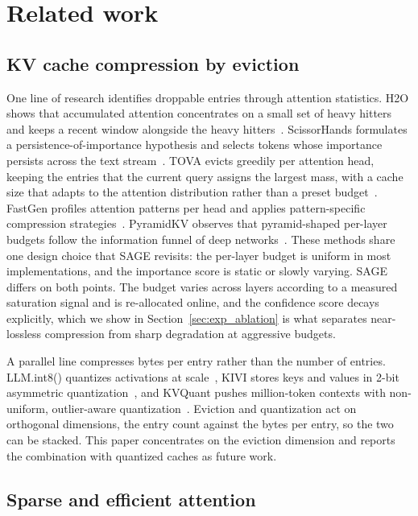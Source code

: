 \section{Related work}\label{sec:related}

\subsection{KV cache compression by eviction}

One line of research identifies droppable entries through attention
statistics. H2O shows that accumulated attention concentrates on a
small set of heavy hitters and keeps a recent window alongside the
heavy hitters~\cite{zhang2023h2o}. ScissorHands formulates a
persistence-of-importance hypothesis and selects tokens whose
importance persists across the text
stream~\cite{liu2023scissorhands}. TOVA evicts greedily per attention
head, keeping the entries that the current query assigns the largest
mass, with a cache size that adapts to the attention distribution
rather than a preset budget~\cite{PLACEHOLDER_oren2024tova_verify}.
FastGen profiles attention patterns per head and applies
pattern-specific compression strategies~\cite{ge2023model}. PyramidKV
observes that pyramid-shaped per-layer budgets follow the information
funnel of deep networks~\cite{zhang2024pyramidkv}. These methods share
one design choice that SAGE revisits: the per-layer budget is uniform
in most implementations, and the importance score is static or slowly
varying. SAGE differs on both points. The budget varies across layers
according to a measured saturation signal and is re-allocated online,
and the confidence score decays explicitly, which we show in
Section~\ref{sec:exp_ablation} is what separates near-lossless
compression from sharp degradation at aggressive budgets.

A parallel line compresses bytes per entry rather than the number of
entries. LLM.int8() quantizes activations at
scale~\cite{dettmers2022llmint8}, KIVI stores keys and values in 2-bit
asymmetric quantization~\cite{liu2024kivi}, and KVQuant pushes
million-token contexts with non-uniform, outlier-aware
quantization~\cite{hooper2024kvquant}. Eviction and quantization act
on orthogonal dimensions, the entry count against the bytes per entry,
so the two can be stacked. This paper concentrates on the eviction
dimension and reports the combination with quantized caches as future
work.

\subsection{Sparse and efficient attention}

